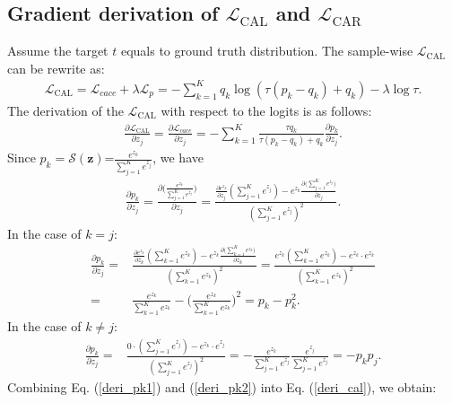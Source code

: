 \documentclass{article}
\begin{document}
\subsection{Gradient derivation of $\mathcal{L}_{\textrm{CAL}}$ and $\mathcal{L}_{\textrm{CAR}}$}
\label{apd:Grad_derivation}
Assume the target $t$ equals to ground truth distribution. The sample-wise $\mathcal{L}_{\textrm{CAL}}$ can be rewrite as:
\begin{align}
	\mathcal{L}_{\textrm{CAL}}=\mathcal{L}_{cace}+\lambda\mathcal{L}_{p} =-\sum_{k=1}^{K}q_{k}\log(\tau (p_{k}-q_{k})+q_{k})-\lambda \log \tau.
\end{align}
The derivation of the $\mathcal{L}_{\textrm{CAL}}$ with respect to the logits is as follows:
\begin{align}
	\label{deri_cal}
	\frac{\partial \mathcal{L}_{\textrm{CAL}}}{\partial z_{j}}=\frac{\partial \mathcal{L}_{cace}}{\partial z_{j}}=-\sum_{k=1}^{K}\frac{\tau q_{k}}{\tau (p_{k}-q_{k})+q_{k}}\frac{\partial p_{k}}{\partial z_{j}}.
\end{align}
Since $p_{k}=\mathcal{S}(\bm{z})$=$\frac{e^{z_{k}}}{\sum_{j=1}^{K}e^{z_{j}}}$, we have 
\begin{align}
	\frac{\partial p_{k}}{\partial z_{j}}=\frac{\partial \big(\frac{e^{z_{k}}}{\sum_{j=1}^{K}e^{z_{j}}} \big)}{\partial z_{j}}=\frac{\frac{\partial e^{z_{k}}}{\partial z_{j}}(\sum_{j=1}^{K}e^{z_{j}})-e^{z_{k}}\frac{\partial\big( \sum_{j=1}^{K}e^{z_{j}} \big)}{\partial z_{j}}}{(\sum_{j=1}^{K}e^{z_{j}})^2}.
\end{align}
In the case of $k=j:$
\begin{align}
	\label{deri_pk1}
	\frac{\partial p_{k}}{\partial z_{j}}=&\frac{\frac{\partial e^{z_{k}}}{\partial z_{k}}(\sum_{k=1}^{K}e^{z_{k}})-e^{z_{k}}\frac{\partial\big( \sum_{k=1}^{K}e^{z_{k}} \big)}{\partial z_{k}}}{(\sum_{k=1}^{K}e^{z_{k}})^2}=\frac{e^{z_{k}}(\sum_{k=1}^{K}e^{z_{k}})-e^{z_{k}}\cdot e^{z_{k}}}{(\sum_{k=1}^{K}e^{z_{k}})^2} \nonumber \\
	=&\frac{e^{z_{k}}}{\sum_{k=1}^{K}e^{z_{k}}}-\Big(\frac{e^{z_{k}}}{\sum_{k=1}^{K}e^{z_{k}}}\Big)^2=p_{k}-p_{k}^2.
\end{align}
In the case of $k\ne j:$
\begin{align}
	\label{deri_pk2}
	\frac{\partial p_{k}}{\partial z_{j}}=&\frac{0\cdot(\sum_{j=1}^{K}e^{z_{j}})-e^{z_{k}}\cdot e^{z_{j}}}{(\sum_{j=1}^{K}e^{z_{j}})^2}=-\frac{e^{z_{k}}}{\sum_{j=1}^{K}e^{z_{j}}} \frac{e^{z_{j}}}{\sum_{j=1}^{K}e^{z_{j}}} = -p_{k}p_{j}.
\end{align}
Combining Eq. (\ref{deri_pk1}) and (\ref{deri_pk2}) into Eq. (\ref{deri_cal}), we obtain:
\end{document}
